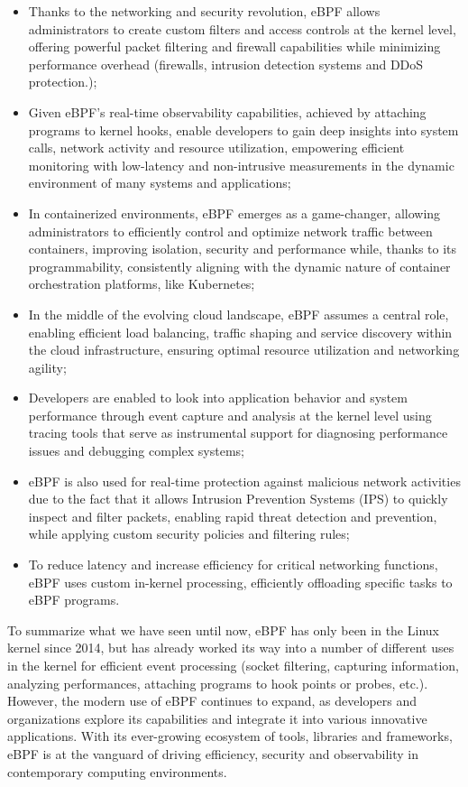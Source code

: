 \begin{itemize}
	\item Thanks to the networking and security revolution, eBPF allows administrators
		to create custom filters and access controls at the kernel level, offering powerful packet filtering and firewall capabilities while minimizing performance overhead (firewalls, intrusion detection systems and DDoS protection.);
	\item Given eBPF's real-time observability capabilities, achieved by attaching
		programs to kernel hooks, enable developers to gain deep insights into system calls, network activity and resource utilization, empowering efficient monitoring with low-latency and non-intrusive measurements in the dynamic environment of many systems and applications;
	\item In containerized environments, eBPF emerges as a game-changer, allowing
		administrators to efficiently control and optimize network traffic between containers, improving isolation, security and performance while, thanks to its programmability, consistently aligning with the dynamic nature of container orchestration platforms, like Kubernetes;
	\item In the middle of the evolving cloud landscape, eBPF assumes a central role,
		enabling efficient load balancing, traffic shaping and service discovery within the cloud infrastructure, ensuring optimal resource utilization and networking agility;
	\item Developers are enabled to look into application behavior and system
		performance through event capture and analysis at the kernel level using tracing tools that serve as instrumental support for diagnosing	performance issues and debugging complex systems;
	\item eBPF is also used for real-time protection against malicious network
		activities due to the fact that it allows Intrusion Prevention Systems (IPS) to quickly inspect and filter packets, enabling rapid threat detection and prevention, while applying custom security policies and filtering rules;
	\item To reduce latency and increase efficiency for critical networking functions,
		eBPF uses custom in-kernel processing, efficiently offloading specific tasks to eBPF programs.
\end{itemize}

To summarize what we have seen until now, eBPF has only been in the Linux kernel since 2014, but has already worked its way into a number of different uses in the kernel for efficient event processing (socket filtering, capturing information, analyzing performances, attaching programs to hook points or probes, etc.). 
However, the modern use of eBPF continues to expand, as developers and organizations explore its capabilities and integrate it into various innovative applications. 
With its ever-growing ecosystem of tools, libraries and frameworks, eBPF is at the vanguard of driving efficiency, security and observability in contemporary computing environments.

